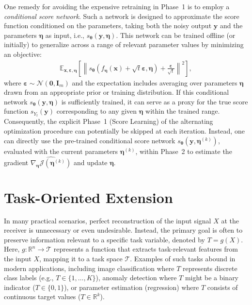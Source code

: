\documentclass[conference]{IEEEtran}
\newcommand{\R}{\mathbb{R}}
\newcommand{\E}{\mathbb{E}}
\begin{document}
One remedy for avoiding the expensive retraining in Phase~1 
is to employ a {\em conditional score network}. Such a network is designed 
to approximate the score function conditioned on the parameters, 
taking both the noisy output $\bm y$ and the parameters $\bm \eta$ as input, 
i.e., $s_{\bm \theta}(\bm y, \bm \eta)$. 
This network can be trained offline (or initially) 
to generalize across a range of relevant parameter values by minimizing 
an objective:
\begin{align}
\E_{\bm x, \bm \varepsilon, \bm \eta}\left[\left\|s_{\bm \theta}
(f_{\bm \eta}(\bm x)+\sqrt{t} \bm \varepsilon, \bm \eta)
+ \frac{\bm \varepsilon}{\sqrt{t}}\right\|^2\right],
\label{eq:conditional_dsm}
\end{align}
where $\bm \varepsilon \sim \mathcal{N}(\bm{0}, \bm I_m)$ and the 
expectation includes averaging over parameters $\bm \eta$ 
drawn from an appropriate prior or training distribution. 
If this conditional network $s_{\bm \theta}(\bm y, \bm \eta)$ is sufficiently trained, 
it can serve as a proxy for the true score function $s_{Y_t}(\bm y)$ corresponding 
to any given $\bm \eta$ within the trained range. 
Consequently, the explicit {Phase~1 (Score Learning) of 
the alternating optimization procedure can potentially be skipped} 
at each iteration. Instead, one can directly use the pre-trained conditional score network 
$s_{\bm \theta}(\bm y, \bm \eta^{(k)})$, 
evaluated with the current parameters $\bm \eta^{(k)}$, 
within Phase~2 to estimate the gradient $\widehat{\nabla_{\bm\eta} \mathcal{J}(\bm \eta^{(k)})}$ 
and update $\bm \eta$.

\section{Task-Oriented Extension}
\label{sec:task}

In many practical scenarios, perfect reconstruction of the input signal $X$ at the receiver 
is unnecessary or even undesirable. Instead, the primary goal is often to preserve information 
relevant to a specific task variable, denoted by $T = g(X)$. 
Here, $g: \R^n \to \mathcal{T}$ represents a function that extracts task-relevant features 
from the input $X$, mapping it to a task space $\mathcal{T}$. 
Examples of such tasks abound in modern applications, 
including image classification where $T$ represents discrete class 
labels (e.g., $T \in \{1,\ldots,K\}$), anomaly detection where $T$ might be 
a binary indicator ($T \in \{0,1\}$), 
or parameter estimation (regression) where $T$ consists 
of continuous target values ($T \in \R^k$). 
\end{document}
